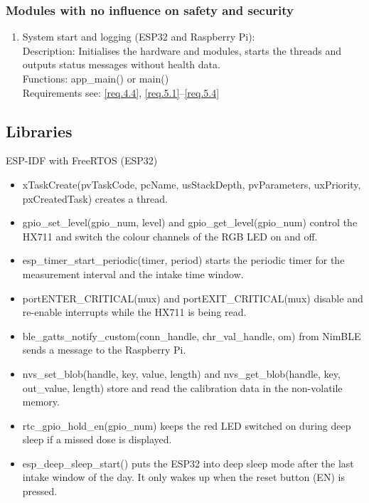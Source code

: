 \subsubsection{Modules with no influence on safety and security}
	\begin{enumerate}
		\item System start and logging (ESP32 and Raspberry Pi): \\
			Description: Initialises the hardware and modules, starts the
			threads and outputs status messages without health data. \\
			Functions: app\_main() or main() \\
			Requirements see: \ref{req.4.4}, \ref{req.5.1}--\ref{req.5.4}
	\end{enumerate}

\subsection{Libraries}

ESP-IDF with FreeRTOS (ESP32)
	\begin{itemize}
		\item xTaskCreate(pvTaskCode, pcName, usStackDepth, pvParameters,
		uxPriority, pxCreatedTask) creates a thread.
		\item gpio\_set\_level(gpio\_num, level) and gpio\_get\_level(gpio\_num)
		control the HX711 and switch the colour channels of the RGB LED on and
		off.
		\item esp\_timer\_start\_periodic(timer, period) starts the periodic
		timer for the measurement interval and the intake time window.
		\item portENTER\_CRITICAL(mux) and portEXIT\_CRITICAL(mux) disable and
		re-enable interrupts while the HX711 is being read.
		\item ble\_gatts\_notify\_custom(conn\_handle, chr\_val\_handle, om) from
		NimBLE sends a message to the Raspberry Pi.
		\item nvs\_set\_blob(handle, key, value, length) and nvs\_get\_blob(handle,
		key, out\_value, length) store and read the calibration data in the
		non-volatile memory.
		\item rtc\_gpio\_hold\_en(gpio\_num) keeps the red LED switched on
		during deep sleep if a missed dose is displayed.
		\item esp\_deep\_sleep\_start() puts the ESP32 into deep sleep mode after
		the last intake window of the day. It only wakes up when the reset
		button (EN) is pressed.
	\end{itemize}

